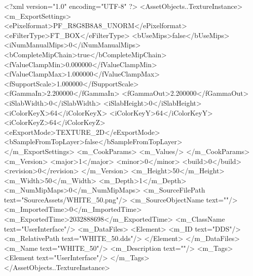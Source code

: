 <?xml version="1.0" encoding="UTF-8" ?>
<AssetObjects..TextureInstance>
	<m_ExportSettings>
		<ePixelformat>PF_R8G8B8A8_UNORM</ePixelformat>
		<eFilterType>FT_BOX</eFilterType>
		<bUseMips>false</bUseMips>
		<iNumManualMips>0</iNumManualMips>
		<bCompleteMipChain>true</bCompleteMipChain>
		<fValueClampMin>0.000000</fValueClampMin>
		<fValueClampMax>1.000000</fValueClampMax>
		<fSupportScale>1.000000</fSupportScale>
		<fGammaIn>2.200000</fGammaIn>
		<fGammaOut>2.200000</fGammaOut>
		<iSlabWidth>0</iSlabWidth>
		<iSlabHeight>0</iSlabHeight>
		<iColorKeyX>64</iColorKeyX>
		<iColorKeyY>64</iColorKeyY>
		<iColorKeyZ>64</iColorKeyZ>
		<eExportMode>TEXTURE_2D</eExportMode>
		<bSampleFromTopLayer>false</bSampleFromTopLayer>
	</m_ExportSettings>
	<m_CookParams>
		<m_Values/>
	</m_CookParams>
	<m_Version>
		<major>1</major>
		<minor>0</minor>
		<build>0</build>
		<revision>0</revision>
	</m_Version>
	<m_Height>50</m_Height>
	<m_Width>50</m_Width>
	<m_Depth>1</m_Depth>
	<m_NumMipMaps>0</m_NumMipMaps>
	<m_SourceFilePath text="SourceAssets/WHITE_50.png"/>
	<m_SourceObjectName text=""/>
	<m_ImportedTime>0</m_ImportedTime>
	<m_ExportedTime>2032888698</m_ExportedTime>
	<m_ClassName text="UserInterface"/>
	<m_DataFiles>
		<Element>
			<m_ID text="DDS"/>
			<m_RelativePath text="WHITE_50.dds"/>
		</Element>
	</m_DataFiles>
	<m_Name text="WHITE_50"/>
	<m_Description text=""/>
	<m_Tags>
		<Element text="UserInterface"/>
	</m_Tags>
</AssetObjects..TextureInstance>

